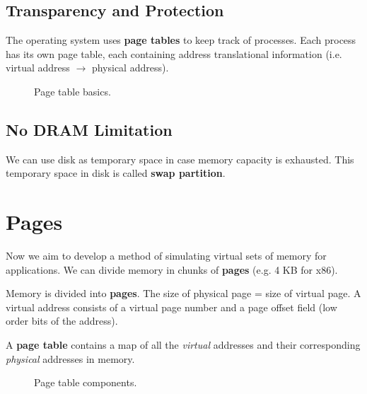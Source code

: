 \subsection{Transparency and Protection}
The operating system uses \textbf{page tables} to keep track of processes. Each process has its own page table, each containing address translational information (i.e. virtual address \(\to\) physical address).

\begin{figure}[h]
  \centering
  \caption{Page table basics.}
  \label{fig:ptbasics}
\end{figure}

\subsection{No DRAM Limitation}
We can use disk as temporary space in case memory capacity is exhausted. This temporary space in disk is called \textbf{swap partition}.

\section{Pages}
Now we aim to develop a method of simulating virtual sets of memory for applications. We can divide memory in chunks of \textbf{pages} (e.g. 4 KB for x86).

\begin{definition}[Page]
  Memory is divided into \textbf{pages}. The size of physical page = size of virtual page. A virtual address consists of a virtual page number and a page offset field (low order bits of the address).
\end{definition}

\begin{definition}
  A \textbf{page table} contains a map of all the \emph{virtual} addresses and their corresponding \emph{physical} addresses in memory. 
\end{definition}

\begin{figure}[H]
  \centering
  \caption{Page table components.}
  \label{fig:pagetablecomp}
\end{figure}

